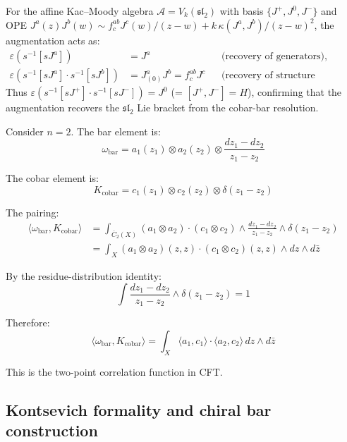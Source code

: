 \begin{example}
\label{ex:augmentation-sl2}
For the affine Kac--Moody algebra
$\mathcal{A} = V_k(\mathfrak{sl}_2)$ with basis
$\{J^+, J^0, J^-\}$ and OPE
$J^a(z) J^b(w) \sim f^{ab}_c J^c(w)/(z-w)
+ k\,\kappa(J^a, J^b)/(z-w)^2$,
the augmentation acts as:
\begin{align*}
\varepsilon(s^{-1}[sJ^a]) &= J^a
  &&\text{(recovery of generators),} \\
\varepsilon(s^{-1}[sJ^a] \cdot s^{-1}[sJ^b])
&= J^a_{(0)}J^b = f^{ab}_c J^c
  &&\text{(recovery of structure constants).}
\end{align*}
Thus $\varepsilon(s^{-1}[sJ^+] \cdot s^{-1}[sJ^-]) = J^0$
(= $[J^+, J^-] = H$),
confirming that the augmentation recovers the
$\mathfrak{sl}_2$ Lie bracket from the cobar-bar resolution.
\end{example}

\begin{example}\label{ex:pairing-two-point}

Consider $n=2$. The bar element is:
\[\omega_{\text{bar}} = a_1(z_1) \otimes a_2(z_2) \otimes \frac{dz_1 - dz_2}{z_1 - z_2}\]

The cobar element is:
\[K_{\text{cobar}} = c_1(z_1) \otimes c_2(z_2) \otimes \delta(z_1 - z_2)\]

The pairing:
\begin{align*}
\langle \omega_{\text{bar}}, K_{\text{cobar}} \rangle &= \int_{\overline{C}_2(X)} 
(a_1 \otimes a_2) \cdot (c_1 \otimes c_2) \wedge \frac{dz_1 - dz_2}{z_1 - z_2} 
\wedge \delta(z_1 - z_2) \\
&= \int_X (a_1 \otimes a_2)(z, z) \cdot (c_1 \otimes c_2)(z, z) \wedge dz \wedge d\bar{z}
\end{align*}

By the residue-distribution identity:
\[\int \frac{dz_1 - dz_2}{z_1 - z_2} \wedge \delta(z_1 - z_2) = 1\]

Therefore:
\[\langle \omega_{\text{bar}}, K_{\text{cobar}} \rangle = \int_X \langle a_1, c_1 
\rangle \cdot \langle a_2, c_2 \rangle \, dz \wedge d\bar{z}\]

This is the two-point correlation function in CFT.
\end{example}

\subsection{Kontsevich formality and chiral bar construction}

